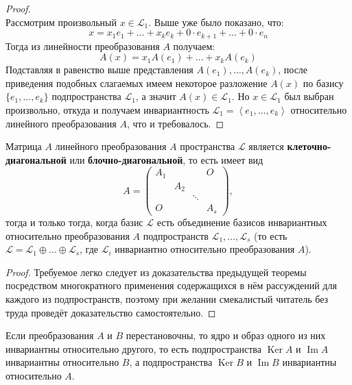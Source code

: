 \documentclass[11pt]{article}
\DeclareMathOperator{\Imm}{Im}
\DeclareMathOperator{\Ker}{Ker}
\begin{document}
\begin{proof}
\begin{equation*}
    \end{equation*}
    Рассмотрим произвольный $x \in \mathcal{L}_1$. Выше уже было показано, что:
    \[x = x_1 e_1 + \ldots + x_k e_k + 0 \cdot e_{k + 1} + \ldots + 0 \cdot e_n\]
    Тогда из линейности преобразования $A$ получаем:
    \[A(x) = x_1 A(e_1) + \ldots + x_k A(e_k)\]
    Подставляя в равенство выше представления $A(e_1), \ldots, A(e_k)$, после приведения подобных слагаемых имеем некоторое разложение $A(x)$ по базису $\{e_1, \ldots, e_k\}$ подпространства $\mathcal{L}_1$, а значит $A(x) \in \mathcal{L}_1$. Но $x \in \mathcal{L}_1$ был выбран произвольно, откуда и получаем инвариантность $\mathcal{L}_1 = \left\langle e_1 , \ldots, e_k \right\rangle $ относительно линейного преобразования $A$, что и требовалось.
\end{proof}

\begin{theorem}
    Матрица $A$ линейного преобразования $A$ пространства $\mathcal{L}$ является \textbf{клеточно-диагональной} или \textbf{блочно-диагональной}, то есть имеет вид
    \begin{equation*}
        A = 
        \begin{pmatrix}
            A_1 & & & O \\
            & A_2 & & \\
            & & \ddots & \\
            O & & & A_s
        \end{pmatrix}
        ,
    \end{equation*}
    тогда и только тогда, когда базис $\mathcal{L}$ есть объединение базисов инвариантных относительно преобразования $A$ подпространств $\mathcal{L}_1, \ldots, \mathcal{L}_s$ (то есть $\mathcal{L} = \mathcal{L}_1 \oplus \ldots \oplus \mathcal{L}_s$, где $\mathcal{L}_i$ инвариантно относительно преобразования $A$).
\end{theorem}

\begin{proof}
    Требуемое легко следует из доказательства предыдущей теоремы посредством многократного применения содержащихся в нём рассуждений для каждого из подпространств, поэтому при желании смекалистый читатель без труда проведёт доказательство самостоятельно.
\end{proof}

\begin{lemma} \label{lemma:2.2}
    Если преобразования $A$ и $B$ перестановочны, то ядро и образ одного из них инвариантны относительно другого, то есть подпространства $\Ker A$ и $\Imm A$ инвариантны относительно $B$, а подпространства $\Ker B$ и $\Imm B$ инвариантны относительно $A$.
\end{lemma}
\end{document}
